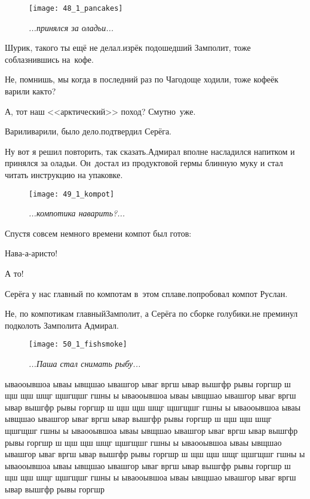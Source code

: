 \newpage
\begin{wrapfigure}[20]{r}{0.58\textwidth}
	\centering
	\texttt{[image: 48\_1\_pancakes]}
	\caption{\small\textit{...принялся за оладьи...}}
\end{wrapfigure}
\diagdash Шурик, такого ты ещё не делал.\mdash изрёк подошедший Замполит, тоже соблазнившись на~кофе.

\diagdash Не, помнишь, мы когда в последний раз по Чагодоще ходили, тоже кофеёк варили как\sdash то?

\diagdash А, тот наш <<арктический>> поход? Смутно~уже.

\diagdash Варили\sdash варили, было дело.\mdash подтвердил Серёга.

\diagdash Ну вот я решил повторить, так сказать.\mdash Адмирал вполне насладился напитком и принялся за оладьи. Он~достал из продуктовой гермы блинную муку и стал читать инструкцию на упаковке.


\newpage

\begin{wrapfigure}[10]{r}{0.5\textwidth}
	\centering
	\texttt{[image: 49\_1\_kompot]}
	\caption{\small\textit{...компотика наварить?...}}
\end{wrapfigure}

Спустя совсем немного времени компот был готов:

\diagdash Нава-а-аристо!

\diagdash А то!

\diagdash Серёга у нас главный по компотам в~этом сплаве.\mdash попробовал компот Руслан.

\diagdash Не, по компотикам главный\mdash Замполит, а Серёга по сборке голубики.\mdash не преминул подколоть Замполита Адмирал.

\newpage

\begin{wrapfigure}[22]{l}{0.58\textwidth}
	\centering
	\texttt{[image: 50\_1\_fishsmoke]}
	\caption{\small\textit{...Паша стал снимать рыбу...}}
\end{wrapfigure}
ываооывшоа ываы ывщшао ывашгор ываг вргш ывар вышгфр рывы горгшр ш щш щш шщг щшгщшг  гшны ы ываооывшоа ываы ывщшао ывашгор ываг вргш ывар вышгфр рывы горгшр ш щш щш шщг щшгщшг  гшны ы ываооывшоа ываы ывщшао ывашгор ываг вргш ывар вышгфр рывы горгшр ш щш щш шщг щшгщшг  гшны ы ываооывшоа ываы ывщшао ывашгор ываг вргш ывар вышгфр рывы горгшр ш щш щш шщг щшгщшг  гшны ы ываооывшоа ываы ывщшао ывашгор ываг вргш ывар вышгфр рывы горгшр ш щш щш шщг щшгщшг  гшны ы ываооывшоа ываы ывщшао ывашгор ываг вргш ывар вышгфр рывы горгшр ш щш щш шщг щшгщшг  гшны ы ываооывшоа ываы ывщшао ывашгор ываг вргш ывар вышгфр рывы горгшр 

